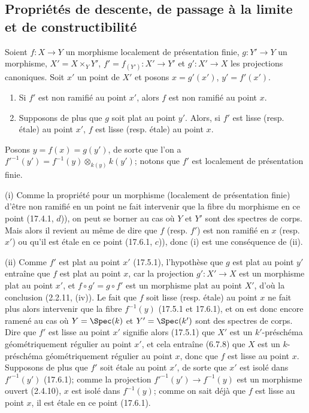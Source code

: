 
\subsection{Propriétés de descente, de passage à la limite et de constructibilité}
\label{IV.17.7}

\begin{proposition}[17.7.1]
\label{IV.17.7.1}
Soient $f:X\to Y$ un morphisme localement de présentation finie, $g:Y'\to Y$ un morphisme, $X'=X\times_Y Y'$, $f'=f_{(Y')}:X'\to Y'$ et $g':X'\to X$ les projections canoniques. Soit $x'$ un point de $X'$ et posons $x=g'(x')$, $y'=f'(x')$.
\begin{enumerate}
  \item[(i)] Si $f'$ est non ramifié au point $x'$, alors $f$ est non ramifié au point $x$.
  \item[(ii)] Supposons de plus que $g$ soit plat au point $y'$. Alors, si $f'$ est lisse (resp. étale) au point $x'$, $f$ est lisse (resp. étale) au point $x$.
\end{enumerate}
\end{proposition}

Posons $y=f(x)=g(y')$, de sorte que l'on a $f'^{-1}(y')=f^{-1}(y)\otimes_{k(y)}k(y')$; notons que $f'$ est localement de présentation finie.

(i) Comme la propriété pour un morphisme (localement de présentation finie) d'être non ramifié en un point ne fait intervenir que la fibre du morphisme en ce point (17.4.1, $d$)), on peut se borner au cas où $Y$ et $Y'$ sont des spectres de corps. Mais alors il revient au même de dire que $f$ (resp. $f'$) est non ramifié en $x$ (resp. $x'$) ou qu'il est étale en ce point (17.6.1, $c$)), donc (i) est une conséquence de (ii).

(ii) Comme $f'$ est plat au point $x'$ (17.5.1), l'hypothèse que $g$ est plat au point $y'$ entraîne que $f$ est plat au point $x$, car la projection $g':X'\to X$ est un morphisme plat au point $x'$, et $f\circ g'=g\circ f'$ est un morphisme plat au point $X'$, d'où la conclusion (2.2.11, (iv)). Le fait que $f$ soit lisse (resp. étale) au point $x$ ne fait plus alors intervenir que la fibre $f^{-1}(y)$ (17.5.1 et 17.6.1), et on est donc encore ramené au cas où $Y=\Spec(k)$ et $Y'=\Spec(k')$ sont des spectres de corps. Dire que $f'$ est lisse au point $x'$ signifie alors (17.5.1) que $X'$ est un $k'$-préschéma géométriquement régulier au point $x'$, et cela entraîne (6.7.8) que $X$ est un $k$-préschéma géométriquement régulier au point $x$, donc que $f$ est lisse au point $x$. Supposons de plus que $f'$ soit étale au point $x'$, de sorte que $x'$ est isolé dans $f'^{-1}(y')$ (17.6.1); comme la projection $f'^{-1}(y')\to f^{-1}(y)$ est un morphisme ouvert (2.4.10), $x$ est isolé dans $f^{-1}(y)$; comme on sait déjà que $f$ est lisse au point $x$, il est étale en ce point (17.6.1).

